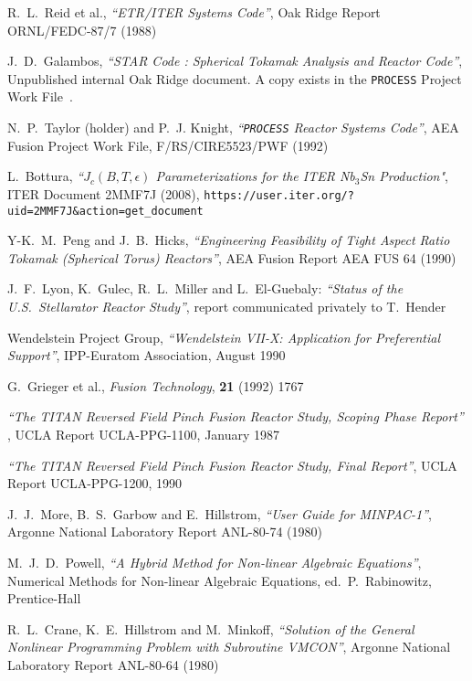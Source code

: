\documentclass[11pt,a4paper]{report}
\newcommand{\process}{\mbox{\texttt{PROCESS}}}
\begin{document}
\begin{thebibliography}{99}

R.\ L.\ Reid et al.,
\textit{``ETR/ITER Systems Code''},
Oak Ridge Report ORNL/FEDC-87/7
(1988)

J.\ D.\ Galambos,
\textit{``STAR Code : Spherical Tokamak Analysis and Reactor Code''},
Unpublished internal Oak Ridge document. A copy exists in the \process\/
Project Work File~\cite{PWF}.

N.\ P.\ Taylor (holder) and P.\ J. Knight,
\textit{``\process\/ Reactor Systems Code''},
AEA Fusion Project Work File, F/RS/CIRE5523/PWF
(1992)

L.\ Bottura,
\textit{``$J_c(B,T,\epsilon)$ Parameterizations for the ITER Nb$_3$Sn
  Production"},
ITER Document 2MMF7J (2008),
\texttt{https://user.iter.org/?uid=2MMF7J\&action=get\_document}

Y-K.\ M.\ Peng and J.\ B.\ Hicks,
\textit{``Engineering Feasibility of Tight Aspect Ratio Tokamak
(Spherical Torus) Reactors''},
AEA Fusion Report AEA FUS 64
(1990)

J.\ F.\ Lyon, K.\ Gulec, R.\ L.\ Miller and L.\ El-Guebaly:
\textit{``Status of the U.S.\ Stellarator Reactor Study''},
report communicated privately to T.\ Hender

Wendelstein Project Group,
\textit{``Wendelstein VII-X: Application for Preferential Support''},
IPP-Euratom Association, August 1990

G.\ Grieger et al., \textit{Fusion Technology}, \textbf{21} (1992) 1767

\textit{``The TITAN Reversed Field Pinch Fusion Reactor Study, Scoping Phase
Report''} ,
UCLA Report UCLA-PPG-1100, January 1987

\textit{``The TITAN Reversed Field Pinch Fusion Reactor Study, Final Report''},
UCLA Report UCLA-PPG-1200, 1990

J.\ J.\ More, B.\ S.\ Garbow and E.\ Hillstrom,
\textit{``User Guide for MINPAC-1''},
Argonne National Laboratory Report ANL-80-74
(1980)

M.\ J.\ D.\ Powell,
\textit{``A Hybrid Method for Non-linear Algebraic Equations''},
Numerical Methods for Non-linear Algebraic Equations, ed.\ P.\ Rabinowitz,
Prentice-Hall

R.\ L.\ Crane, K.\ E.\ Hillstrom and M.\ Minkoff,
\textit{``Solution of the General Nonlinear Programming Problem with
Subroutine VMCON''},
Argonne National Laboratory Report ANL-80-64
(1980)


\end{thebibliography}
\end{document}
